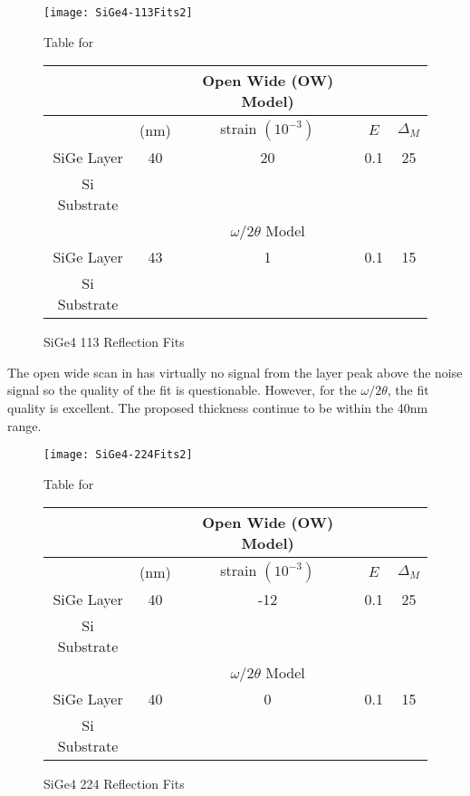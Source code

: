 \begin{figure}[hc]%
\caption{SiGe4 113 Reflection Fits}
\label{SiGe4-113}
\begin{minipage}{0.85\linewidth}
\texttt{[image: SiGe4-113Fits2]}
\end{minipage}
\begin{minipage}{\linewidth}
\centering
\vspace{10pt}
Table for \\
\vspace{5pt}
\begin{tabular}{c|cccc}
			& 	&Open Wide (OW) Model)	 \\
\hline
			&	(nm)	&	strain  $(10^{-3})$	&	$E$  &  $\Delta_M$\\
\hline
SiGe Layer		&  	40	&   20	 &0.1 & 25 	\\
Si Substrate		&	\textemdash & \textemdash&\textemdash\ &\textemdash	\\
\hline
			& &$\omega/2\theta$ Model \\
\hline
SiGe Layer		&	43	& 1	&0.1&15 	\\
Si Substrate		&	\textemdash & \textemdash&\textemdash\ &\textemdash
\end{tabular}
\end{minipage}
\end{figure}

The open wide scan in  has virtually no signal from the layer peak above the noise signal so the quality of the fit is questionable.  However, for the $\omega/2\theta$, the fit quality is excellent.  The proposed thickness continue to be within the 40nm range.

\begin{figure}[hc]%
\caption{SiGe4 224 Reflection Fits}
\label{SiGe4-224}
\begin{minipage}{0.85\linewidth}
\texttt{[image: SiGe4-224Fits2]}
\end{minipage}
\begin{minipage}{\linewidth}
\centering
\vspace{10pt}
Table for \\
\vspace{5pt}
\begin{tabular}{c|cccc}
			& 	&Open Wide (OW) Model)	 \\
\hline
			&	(nm)	&	strain $(10^{-3})$	&	$E$ &  $\Delta_M$\\
\hline
SiGe Layer		&  	40	&      -12	 &0.1 & 25	\\
Si Substrate		&	\textemdash & \textemdash&\textemdash\ &\textemdash	\\
\hline
			& &$\omega/2\theta$ Model \\
\hline
SiGe Layer		&	40	& 0	&0.1	&15	\\
Si Substrate		&	\textemdash & \textemdash&\textemdash\ &\textemdash
\end{tabular}
\end{minipage}
\end{figure}


